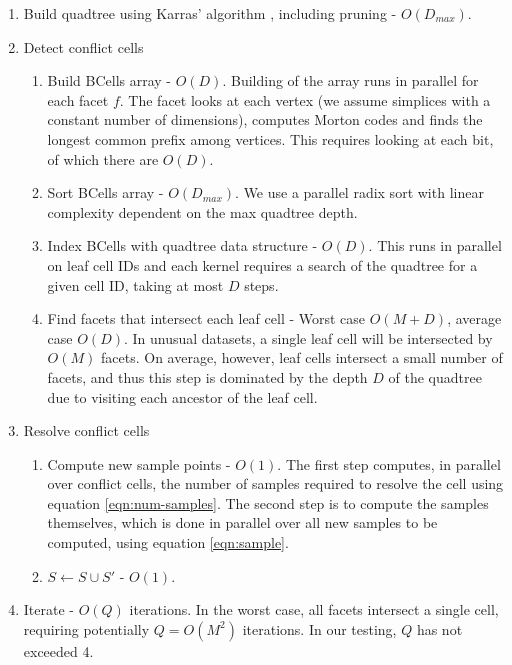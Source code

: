 \documentclass[final,3p,times,twocolumn]{elsarticle}
\begin{document}
\begin{enumerate}
\item Build quadtree using Karras' algorithm \cite{karras2012maximizing}, including pruning - $O(D_{max})$.
\item Detect conflict cells
  \begin{enumerate}
  \item Build BCells array - $O(D)$. Building of the array runs in parallel for each facet $f$. The facet looks at each vertex (we assume simplices with a constant number of dimensions), computes Morton codes and finds the longest common prefix among vertices. This requires looking at each bit, of which there are $O(D)$.
  \item Sort BCells array - $O(D_{max})$. We use a parallel radix sort with linear complexity dependent on the max quadtree depth.
  \item Index BCells with quadtree data structure - $O(D)$. This runs in parallel on leaf cell IDs and each kernel requires a search of the quadtree for a given cell ID, taking at most $D$ steps.
  \item Find facets that intersect each leaf cell - Worst case $O(M+D)$, average case $O(D)$. In unusual datasets, a single leaf cell will be intersected by $O(M)$ facets. On average, however, leaf cells intersect a small number of facets, and thus this step is dominated by the depth $D$ of the quadtree due to visiting each ancestor of the leaf cell.
  \end{enumerate}
\item Resolve conflict cells
  \begin{enumerate}
  \item Compute new sample points - $O(1)$. The first step computes, in parallel over conflict cells, the number of samples required to resolve the cell using equation \eqref{eqn:num-samples}. The second step is to compute the samples themselves, which is done in parallel over all new samples to be computed, using equation \eqref{eqn:sample}.
  \item $S \leftarrow S \cup S'$ - $O(1)$.
  \end{enumerate}
\item Iterate - $O(Q)$ iterations. In the worst case, all facets intersect a single cell, requiring potentially $Q=O(M^2)$ iterations. In our testing, $Q$ has not exceeded 4.
\end{enumerate}
\end{document}
